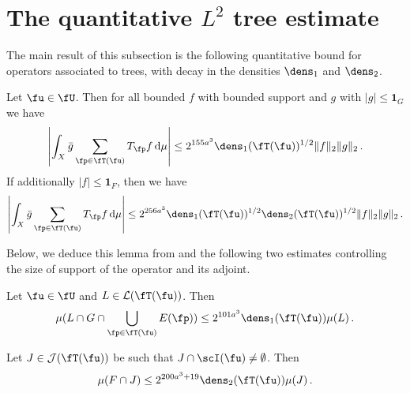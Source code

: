 \section{The quantitative \texorpdfstring{$L^2$}{L2} tree estimate}

The main result of this subsection is the following quantitative bound for operators associated to trees, with decay in the densities $\dens_1$ and $\dens_2$.

\begin{lemma}
    \label{densities-tree-bound}
    \leanok
    Let $\fu \in \fU$. Then for all bounded $f$ with bounded support and $g$ with $|g| \le \mathbf{1}_G$
    we have
    \begin{equation}
        \label{eq-cor-tree-est}
        \left|\int_X \bar g \sum_{\fp \in \fT(\fu)} T_{\fp }f \, \mathrm{d}\mu \right| \le 2^{155a^3} \dens_1(\fT(\fu))^{1/2} \|f\|_2\|g\|_2\,.
    \end{equation}
    If additionally $|f| \le \mathbf{1}_F$, then we have
    \begin{equation}
        \label{eq-cor-tree-est-F}
        \left| \int_X \bar g \sum_{\fp \in \fT(\fu)} T_{\fp }f\, \mathrm{d}\mu \right| \le 2^{256a^3} \dens_1(\fT(\fu))^{1/2} \dens_2(\fT(\fu))^{1/2} \|f\|_2\|g\|_2\,.
    \end{equation}
\end{lemma}

Below, we deduce this lemma from  and the following two estimates controlling the size of support of the operator and its adjoint.

\begin{lemma}
    \label{local-dens1-tree-bound}
    \leanok
    Let $\fu \in \fU$ and $L \in \mathcal{L}(\fT(\fu))$. Then
    \begin{equation}
    \label{eq-1density-estimate-tree}
        \mu(L \cap G \cap \bigcup_{\fp \in \fT(\fu)} E(\fp)) \le 2^{101a^3} \dens_1(\fT(\fu)) \mu(L)\,.
    \end{equation}
\end{lemma}

\begin{lemma}
    \label{local-dens2-tree-bound}
    \leanok
    Let $J \in \mathcal{J}(\fT(\fu))$ be such that $J \cap \scI(\fu) \ne \emptyset$. Then
    $$
        \mu(F \cap J) \le 2^{200a^3 + 19} \dens_2(\fT(\fu)) \mu(J)\,.
    $$
\end{lemma}


